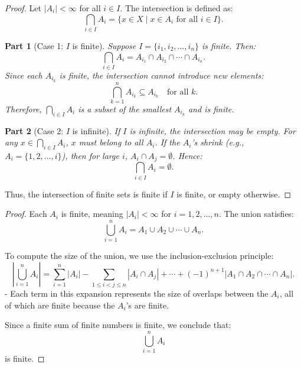 \documentclass[11pt,openany]{article}
\begin{document}
\newpage
{}
\newtheorem{proofpart}{Part}
\begin{proof}
	Let \( |A_i| < \infty \) for all \( i \in I \). The intersection is defined as:
	\[
	\bigcap_{i \in I} A_i = \{x \in X \mid x \in A_i \text{ for all } i \in I\}.
	\]
	
	\begin{proofpart}[Case 1: \( I \) is finite]
		Suppose \( I = \{i_1, i_2, \dots, i_n\} \) is finite. Then:
		\[
		\bigcap_{i \in I} A_i = A_{i_1} \cap A_{i_2} \cap \cdots \cap A_{i_n}.
		\]
		Since each \( A_{i_k} \) is finite, the intersection cannot introduce new elements:
		\[
		\bigcap_{k=1}^n A_{i_k} \subseteq A_{i_k} \quad \text{for all } k.
		\]
		Therefore, \( \bigcap_{i \in I} A_i \) is a subset of the smallest \( A_{i_k} \) and is finite.
		
	\end{proofpart}
	
	\begin{proofpart}[Case 2: \( I \) is infinite]
		If \( I \) is infinite, the intersection may be empty. For any \( x \in \bigcap_{i \in I} A_i \), \( x \) must belong to all \( A_i \). If the \( A_i \)'s shrink (e.g., \( A_i = \{1, 2, \dots, i\} \)), then for large \( i \), \( A_i \cap A_j = \emptyset \). Hence:
		\[
		\bigcap_{i \in I} A_i = \emptyset.
		\]
	\end{proofpart}
	
	Thus, the intersection of finite sets is finite if \( I \) is finite, or empty otherwise.
\end{proof}

\begin{proof}
	Each \( A_i \) is finite, meaning \( |A_i| < \infty \) for \( i = 1, 2, \dots, n \). The union satisfies:
	\[
	\bigcup_{i=1}^n A_i = A_1 \cup A_2 \cup \cdots \cup A_n.
	\]
	
	To compute the size of the union, we use the inclusion-exclusion principle:
	\[
	\left| \bigcup_{i=1}^n A_i \right| = \sum_{i=1}^n |A_i| - \sum_{1 \leq i < j \leq n} |A_i \cap A_j| + \cdots + (-1)^{n+1} |A_1 \cap A_2 \cap \cdots \cap A_n|.
	\]
	- Each term in this expansion represents the size of overlaps between the \( A_i \), all of which are finite because the \( A_i \)'s are finite.
	
	Since a finite sum of finite numbers is finite, we conclude that:
	\[
	\bigcup_{i=1}^n A_i
	\]
	is finite.
\end{proof}
\end{document}
